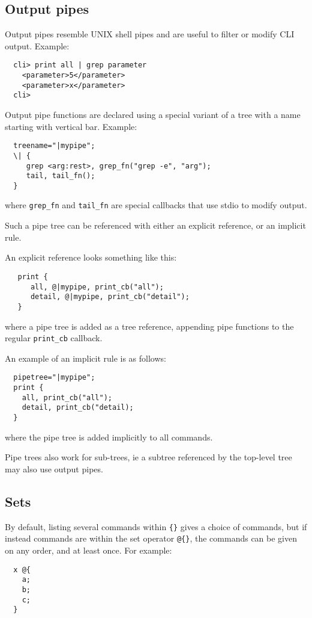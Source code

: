 \documentclass[a4paper, 10pt] {article}
\begin{document}
\subsection{Output pipes}
\label{sec:pipes}

Output pipes resemble UNIX shell pipes and are useful to filter or modify CLI output. Example:
\begin{verbatim}
  cli> print all | grep parameter
    <parameter>5</parameter>
    <parameter>x</parameter>
  cli>
\end{verbatim}

Output pipe functions are declared using a special variant of a tree
with a name starting with vertical bar. Example:
\begin{verbatim}
  treename="|mypipe";
  \| { 
     grep <arg:rest>, grep_fn("grep -e", "arg");
     tail, tail_fn();
  }
\end{verbatim}
where {\tt grep\_fn} and {\tt tail\_fn} are special callbacks that use stdio to modify output.

Such a pipe tree can be referenced with either an explicit reference, or an implicit rule.

An explicit reference looks something like this:
\begin{verbatim}
   print {     
      all, @|mypipe, print_cb("all");
      detail, @|mypipe, print_cb("detail");
   }
\end{verbatim}
where a pipe tree is added as a tree reference, appending pipe functions to the regular {\tt print\_cb} callback.

An example of an implicit rule is as follows:
\begin{verbatim}
  pipetree="|mypipe";
  print {
    all, print_cb("all");
    detail, print_cb("detail);
  }
\end{verbatim}
where the pipe tree is added implicitly to all commands.

Pipe trees also work for sub-trees, ie a subtree referenced by the top-level tree may also use output pipes.

\subsection{Sets}
\label{sec:sets}
By default, listing several commands within {\tt \{\}} gives a choice of commands, but if instead commands are within the set operator {\tt @\{\}}, the commands can be given on any order, and at least once. For example:
\begin{verbatim}
  x @{
    a;
    b;
    c;
  }
\end{verbatim}
\end{document}
